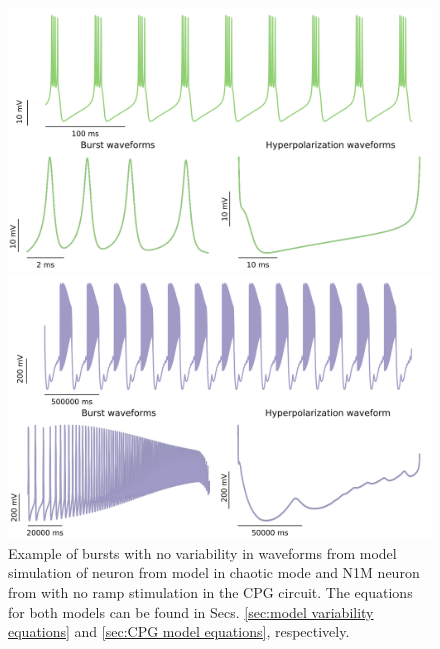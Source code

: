 \begin{figure}[hbt]
	\centering
	\begin{minipage}{0.48\textwidth}
		\includegraphics[width=\textwidth]{img/invariants/variability/GHmodel.png}
	\end{minipage}
	\begin{minipage}{0.48\textwidth}
		\includegraphics[width=\textwidth]{img/invariants/variability/N1Mnovar.png}
	\end{minipage}
	\caption{Example of bursts with no variability in waveforms from model simulation of neuron from \cite{ghigliazza_minimal_2004} model in chaotic mode and N1M neuron from \cite{vavoulis_dynamic_2007} with no ramp stimulation in the CPG circuit. The equations for both models can be found in Secs. \ref{sec:model variability equations} and \ref{sec:CPG model equations}, respectively.}
	\label{fig:model burst no variability}
\end{figure}



